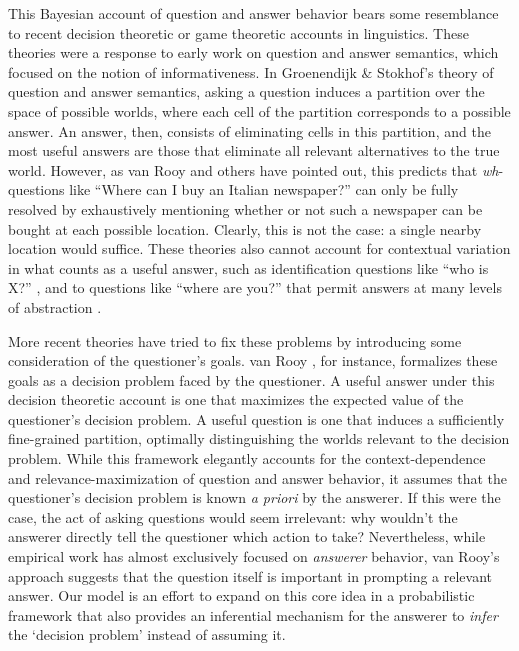 \documentclass[10pt,letterpaper]{article}
\begin{document}
This Bayesian account of question and answer behavior bears some resemblance to recent decision theoretic or game theoretic accounts in linguistics. These theories were a response to early work on question and answer semantics, which focused on the notion of informativeness. In Groenendijk \& Stokhof's \citeyear{GroenendijkStokhof84_SemanticsOfQuestions} theory of question and answer semantics, asking a question induces a partition over the space of possible worlds, where each cell of the partition corresponds to a possible answer. An answer, then, consists of eliminating cells in this partition, and the most useful answers are those that eliminate all relevant alternatives to the true world. However, as van Rooy \cite{VanRooy03_QuestioningDecisionProblems} and others \cite{Ginzburg95_ResolvingQuestions} have pointed out, this predicts that \emph{wh}-questions like ``Where can I buy an Italian newspaper?'' can only be fully resolved by exhaustively mentioning whether or not such a newspaper can be bought at each possible location. Clearly, this is not the case: a single nearby location would suffice. These theories also cannot account for  contextual variation in what counts as a useful answer, such as identification questions like ``who is X?'' \cite{BoerLycan75_KnowingWho}, and to questions like ``where are you?'' that permit answers at many levels of abstraction \cite{Potts12_CardsDialogueCorpus}. 

More recent theories have tried to fix these problems by introducing some consideration of the questioner's goals. van Rooy \citeyear{VanRooy03_QuestioningDecisionProblems}, for instance, formalizes these goals as a decision problem faced by the questioner. A useful answer under this decision theoretic account is one that maximizes the expected value of the questioner's decision problem. A useful question is one that induces a sufficiently fine-grained partition, optimally distinguishing the worlds relevant to the decision problem. While this framework elegantly accounts for the context-dependence and relevance-maximization of question and answer behavior, it assumes that the questioner's decision problem is known \emph{a priori} by the answerer. If this were the case, the act of asking questions would seem irrelevant: why wouldn't the answerer directly tell the questioner which action to take? Nevertheless, while empirical work has almost exclusively focused on \emph{answerer} behavior, van Rooy's approach suggests that the question itself is important in prompting a relevant answer. Our model is an effort to expand on this core idea in a probabilistic framework that also provides an inferential mechanism for the answerer to \emph{infer} the `decision problem' instead of assuming it.
 
\end{document}
